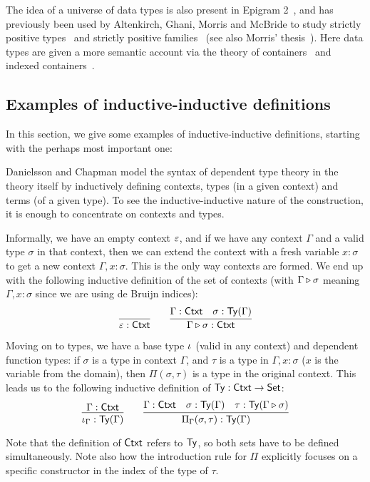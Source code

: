 \documentclass{article}
\begin{document}
The idea of a universe of data types is also present in Epigram
2~\cite{mcbride2010levitation}, and has previously been used by
Altenkirch, Ghani, Morris and McBride to study strictly positive
types~\cite{morrisAltenkirchMcBride2006regularTreeTypes} and strictly
positive families~\cite{morrisAltenkirchGhani2009SPFjournal} (see also
Morris' thesis~\cite{morris2007thesis}). Here data types are given a
more semantic account via the theory of
containers~\cite{abbottAltenkirchGhani2005containers} and indexed
containers~\cite{altenkirchMorris2009indexedCont}.




\subsection{Examples of inductive-inductive definitions}
\label{sec:examples}

In this section, we give some examples of inductive-inductive
definitions, starting with the perhaps most important one:

\begin{example}
\label{ex:ctxt-type}

Danielsson \cite{danielsson2007formalisation} and Chapman
\cite{chapman2009eatitself} model the syntax of dependent type theory
in the theory itself by inductively defining contexts, types (in a
given context) and terms (of a given type). To see the
inductive-inductive nature of the construction, it is enough to
concentrate on contexts and types.

Informally, we have an empty context $\varepsilon$, and if we have any
context $\Gamma$ and a valid type $\sigma$ in that context, then we
can extend the context with a fresh variable $x : \sigma$ to get a new
context $\Gamma, x : \sigma$. This is the only way contexts are
formed. We end up with the following inductive definition of the set
of contexts (with $\Gamma \triangleright \sigma$ meaning $\Gamma, x :
\sigma$ since we are using de Bruijn indices):
\[
\infer{\emptyCtxt : \Ctxt}{} \qquad
\infer{\consCtxt{\Gamma}{\sigma} : \Ctxt}{\Gamma : \Ctxt & \sigma : \Ty(\Gamma)}
\]

Moving on to types, we have a base type $\iota_{}$ (valid in any
context) and dependent function types: if $\sigma$ is a type in
context $\Gamma$, and $\tau$ is a type in $\Gamma, x : \sigma$ ($x$ is
the variable from the domain), then $\Pi(\sigma, \tau)$ is a type in
the original context. This leads us to the following inductive
definition of $\mathsf{Ty} : \mathsf{Ctxt} \to \mathsf{Set}$:
\[
\infer{\baseTy{\Gamma} : \Ty(\Gamma)}{\Gamma : \Ctxt} \qquad
\infer{\piTy{\Gamma}{\sigma}{\tau} : \Ty(\Gamma)}{\Gamma : \Ctxt
                    & \sigma : \Ty(\Gamma)
                    & \tau : \Ty(\consCtxt{\Gamma}{\sigma})}
\]

Note that the definition of $\mathsf{Ctxt}$ refers to $\mathsf{Ty}$, so both sets have
to be defined simultaneously. Note also how the introduction rule for
$\Pi$ explicitly focuses on a specific constructor in the index of the
type of $\tau$. 
\blackqed
\end{example}
\end{document}
